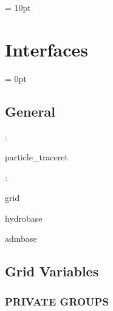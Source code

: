 \vspace{0.5cm}\parskip = 10pt 

\section{Interfaces} 


\parskip = 0pt

\vspace{3mm} \subsection*{General}

: 

particle\_traceret
\vspace{2mm}

: 

grid

hydrobase

admbase
\vspace{2mm}
\subsection*{Grid Variables}
\vspace{5mm}\subsubsection{PRIVATE GROUPS}

\vspace{5mm}

